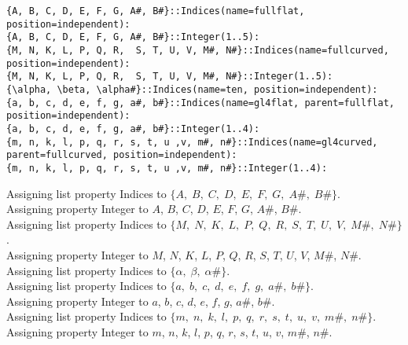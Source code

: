 \documentclass[11pt]{article}
\begin{document}
{\color[named]{Blue}\begin{verbatim}
{A, B, C, D, E, F, G, A#, B#}::Indices(name=fullflat, position=independent):
{A, B, C, D, E, F, G, A#, B#}::Integer(1..5):
{M, N, K, L, P, Q, R,  S, T, U, V, M#, N#}::Indices(name=fullcurved, position=independent):
{M, N, K, L, P, Q, R,  S, T, U, V, M#, N#}::Integer(1..5):
{\alpha, \beta, \alpha#}::Indices(name=ten, position=independent):
{a, b, c, d, e, f, g, a#, b#}::Indices(name=gl4flat, parent=fullflat, position=independent):
{a, b, c, d, e, f, g, a#, b#}::Integer(1..4):
{m, n, k, l, p, q, r, s, t, u ,v, m#, n#}::Indices(name=gl4curved, parent=fullcurved, position=independent):
{m, n, k, l, p, q, r, s, t, u ,v, m#, n#}::Integer(1..4):
\end{verbatim}}
Assigning list property Indices to $\{A,\; B,\; C,\; D,\; E,\; F,\; G,\; A\#,\; B\#\}$.
\\
Assigning property Integer to $A$, $B$, $C$, $D$, $E$, $F$, $G$, $A\#$, $B\#$.
\\
Assigning list property Indices to $\{M,\; N,\; K,\; L,\; P,\; Q,\; R,\; S,\; T,\; U,\; V,\; M\#,\; N\#\}$.
\\
Assigning property Integer to $M$, $N$, $K$, $L$, $P$, $Q$, $R$, $S$, $T$, $U$, $V$, $M\#$, $N\#$.
\\
Assigning list property Indices to $\{\alpha,\; \beta,\; \alpha\#\}$.
\\
Assigning list property Indices to $\{a,\; b,\; c,\; d,\; e,\; f,\; g,\; a\#,\; b\#\}$.
\\
Assigning property Integer to $a$, $b$, $c$, $d$, $e$, $f$, $g$, $a\#$, $b\#$.
\\
Assigning list property Indices to $\{m,\; n,\; k,\; l,\; p,\; q,\; r,\; s,\; t,\; u,\; v,\; m\#,\; n\#\}$.
\\
Assigning property Integer to $m$, $n$, $k$, $l$, $p$, $q$, $r$, $s$, $t$, $u$, $v$, $m\#$, $n\#$.
\\
\end{document}
